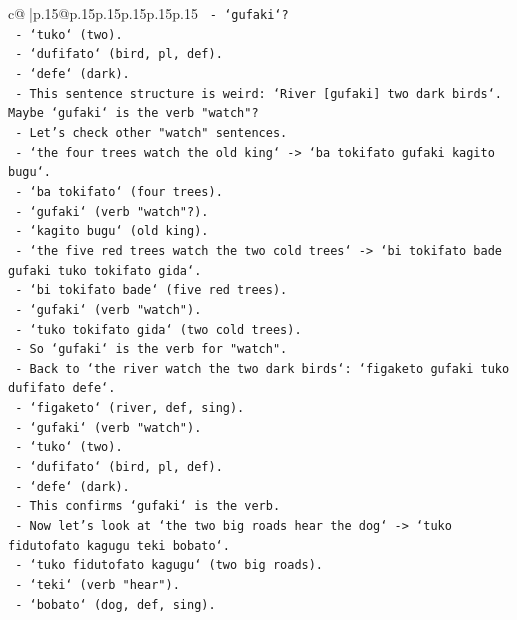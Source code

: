 \documentclass{article}
\begin{document}
{\begin{supertabular}{c@{$\;$}|p{.15\linewidth}@{}p{.15\linewidth}p{.15\linewidth}p{.15\linewidth}p{.15\linewidth}p{.15\linewidth}}
{{{\texttt{     {-} `gufaki`?} \\
\texttt{     {-} `tuko` (two).} \\
\texttt{     {-} `dufifato` (bird, pl, def).} \\
\texttt{     {-} `defe` (dark).} \\
\texttt{     {-} This sentence structure is weird: `River {[}gufaki{]} two dark birds`. Maybe `gufaki` is the verb "watch"?} \\
\texttt{     {-} Let's check other "watch" sentences.} \\
\texttt{     {-} `the four trees watch the old king` {-}> `ba tokifato gufaki kagito bugu`.} \\
\texttt{       {-} `ba tokifato` (four trees).} \\
\texttt{       {-} `gufaki` (verb "watch"?).} \\
\texttt{       {-} `kagito bugu` (old king).} \\
\texttt{     {-} `the five red trees watch the two cold trees` {-}> `bi tokifato bade gufaki tuko tokifato gida`.} \\
\texttt{       {-} `bi tokifato bade` (five red trees).} \\
\texttt{       {-} `gufaki` (verb "watch").} \\
\texttt{       {-} `tuko tokifato gida` (two cold trees).} \\
\texttt{     {-} So `gufaki` is the verb for "watch".} \\
\texttt{     {-} Back to `the river watch the two dark birds`: `figaketo gufaki tuko dufifato defe`.} \\
\texttt{       {-} `figaketo` (river, def, sing).} \\
\texttt{       {-} `gufaki` (verb "watch").} \\
\texttt{       {-} `tuko` (two).} \\
\texttt{       {-} `dufifato` (bird, pl, def).} \\
\texttt{       {-} `defe` (dark).} \\
\texttt{       {-} This confirms `gufaki` is the verb.} \\
\texttt{     {-} Now let's look at `the two big roads hear the dog` {-}> `tuko fidutofato kagugu teki bobato`.} \\
\texttt{       {-} `tuko fidutofato kagugu` (two big roads).} \\
\texttt{       {-} `teki` (verb "hear").} \\
\texttt{       {-} `bobato` (dog, def, sing).} \\
}}}
\end{supertabular}}
\end{document}
